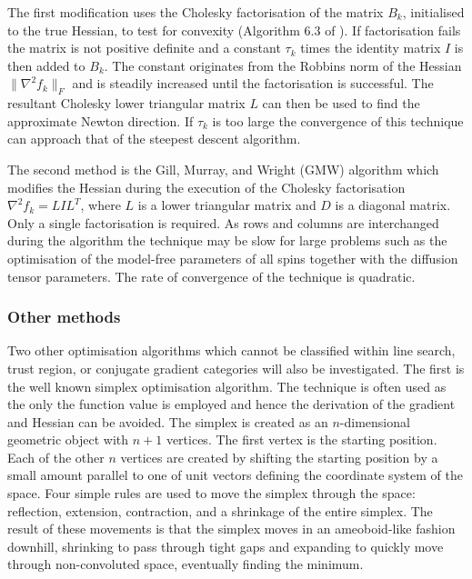 \begin{htmlonly}
\begin{htmlonly}
The first modification uses the Cholesky factorisation of the matrix $B_k$, initialised to the true Hessian, to test for convexity (Algorithm 6.3 of \citet{NocedalWright99}).  If factorisation fails the matrix is not positive definite and a constant $\tau_k$ times the identity matrix $I$ is then added to $B_k$.  The constant originates from the Robbins norm of the Hessian $\lVert \nabla^2 f_k \rVert_F$ and is steadily increased until the factorisation is successful.  The resultant Cholesky lower triangular matrix $L$ can then be used to find the approximate Newton direction.  If $\tau_k$ is too large the convergence of this technique can approach that of the steepest descent algorithm.

The second method is the Gill, Murray, and Wright (GMW) algorithm \citep{GMW81} which modifies the Hessian during the execution of the Cholesky factorisation $\nabla^2 f_k = LIL^T$, where $L$ is a lower triangular matrix and $D$ is a diagonal matrix.  Only a single factorisation is required.  As rows and columns are interchanged during the algorithm the technique may be slow for large problems such as the optimisation of the model-free parameters of all spins together with the diffusion tensor parameters.  The rate of convergence of the technique is quadratic.



\subsubsection{Other methods}

Two other optimisation algorithms which cannot be classified within line search, trust region, or conjugate gradient categories will also be investigated.  The first is the well known simplex optimisation algorithm.  The technique is often used as the only the function value is employed and hence the derivation of the gradient and Hessian can be avoided.  The simplex is created as an $n$-dimensional geometric object with $n+1$ vertices.  The first vertex is the starting position.  Each of the other $n$ vertices are created by shifting the starting position by a small amount parallel to one of unit vectors defining the coordinate system of the space.  Four simple rules are used to move the simplex through the space: reflection, extension, contraction, and a shrinkage of the entire simplex.  The result of these movements is that the simplex moves in an ameoboid-like fashion downhill, shrinking to pass through tight gaps and expanding to quickly move through non-convoluted space, eventually finding the minimum.


\end{htmlonly}
\end{htmlonly}
